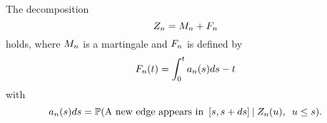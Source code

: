 \begin{lemma} \label{L: decomp Zn}
	The decomposition 
	\begin{equation} \label{E: decomp Zn}
	Z_n = M_n + F_n
	\end{equation}
	holds, where $M_n$ is a martingale and $F_n$ is defined by
	\begin{equation} \label{D: An}
	F_n(t) = \int_{0}^{t} a_n(s)ds - t
	\end{equation}
	with
	\begin{equation} \label{D: an}
	a_n(s)ds = \mathbb{P}(\text{A new edge appears in} \enspace [s, s+ds] \: | \: Z_n(u), \enspace u \leq s).
	\end{equation}
\end{lemma}

